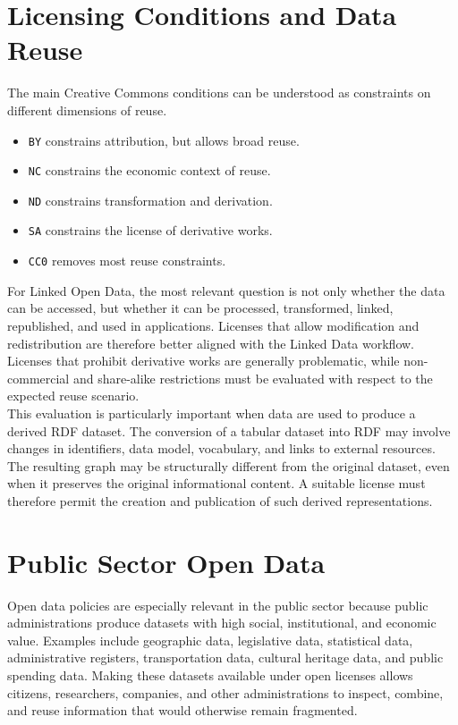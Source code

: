\documentclass{scrbook}
\begin{document}
	\section{Licensing Conditions and Data Reuse}
	
	The main Creative Commons conditions can be understood as constraints on different dimensions of reuse.
	
	\begin{itemize}
	    \item \texttt{BY} constrains attribution, but allows broad reuse.
	    \item \texttt{NC} constrains the economic context of reuse.
	    \item \texttt{ND} constrains transformation and derivation.
	    \item \texttt{SA} constrains the license of derivative works.
	    \item \texttt{CC0} removes most reuse constraints.
	\end{itemize}
	
	For Linked Open Data, the most relevant question is not only whether the data can be accessed, but whether it can be processed, transformed, linked, republished, and used in applications. Licenses that allow modification and redistribution are therefore better aligned with the Linked Data workflow. Licenses that prohibit derivative works are generally problematic, while non-commercial and share-alike restrictions must be evaluated with respect to the expected reuse scenario.\\
	
	This evaluation is particularly important when data are used to produce a derived RDF dataset. The conversion of a tabular dataset into RDF may involve changes in identifiers, data model, vocabulary, and links to external resources. The resulting graph may be structurally different from the original dataset, even when it preserves the original informational content. A suitable license must therefore permit the creation and publication of such derived representations.
	
	\section{Public Sector Open Data}
	
	Open data policies are especially relevant in the public sector because public administrations produce datasets with high social, institutional, and economic value. Examples include geographic data, legislative data, statistical data, administrative registers, transportation data, cultural heritage data, and public spending data. Making these datasets available under open licenses allows citizens, researchers, companies, and other administrations to inspect, combine, and reuse information that would otherwise remain fragmented.\\
	
\end{document}
